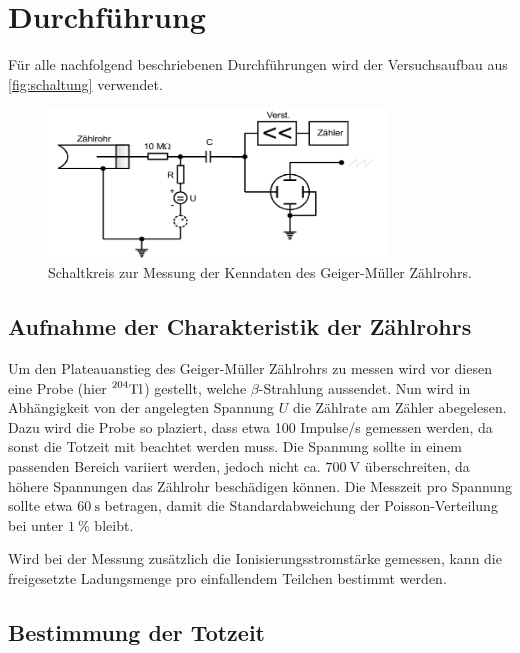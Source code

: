 \section{Durchführung}
\label{sec:Durchführung}

Für alle nachfolgend beschriebenen Durchführungen wird der Versuchsaufbau aus \autoref{fig:schaltung} verwendet.

\begin{figure}
    \centering
    \includegraphics[width=0.8\textwidth]{images/skizze_4.png}
    \caption{Schaltkreis zur Messung der Kenndaten des Geiger-Müller Zählrohrs.\cite{V703}}
    \label{fig:schaltung}
\end{figure}

\subsection{Aufnahme der Charakteristik der Zählrohrs}
\label{ssec:charakteristik_durchführung}

Um den Plateauanstieg des Geiger-Müller Zählrohrs zu messen wird vor diesen eine Probe (hier $\prescript{204}{}{\text{Tl}}$) gestellt, welche $\beta$-Strahlung aussendet.
Nun wird in Abhängigkeit von der angelegten Spannung $U$ die Zählrate am Zähler abegelesen.
Dazu wird die Probe so plaziert, dass etwa 100 Impulse/s gemessen werden, da sonst die Totzeit mit beachtet werden muss.
Die Spannung sollte in einem passenden Bereich variiert werden, jedoch nicht ca. $\SI{700}{\volt}$ überschreiten, da höhere Spannungen das Zählrohr beschädigen können.
Die Messzeit pro Spannung sollte etwa $\SI{60}{\second}$ betragen, damit die Standardabweichung der Poisson-Verteilung bei unter $\SI{1}{\percent}$ bleibt.

Wird bei der Messung zusätzlich die Ionisierungsstromstärke gemessen, kann die freigesetzte Ladungsmenge pro einfallendem Teilchen bestimmt werden.

\subsection{Bestimmung der Totzeit}
\label{ssec:totzeit_durchführung}

